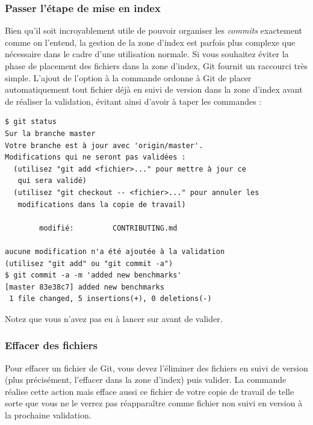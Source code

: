 \subsubsection{Passer l'étape de mise en index}

Bien qu'il soit incroyablement utile de pouvoir organiser les \emph{commits} exactement comme on l'entend, la gestion de la zone d'index est parfois plus complexe que nécessaire dans le cadre d'une utilisation normale.
Si vous souhaitez éviter la phase de placement des fichiers dans la zone d'index, Git fournit un raccourci très simple.
L'ajout de l'option  à la commande  ordonne à Git de placer automatiquement tout fichier déjà en suivi de version dans la zone d'index avant de réaliser la validation, évitant ainsi d'avoir à taper les commandes :
\begin{Schunk}
\begin{Verbatim}
$ git status
Sur la branche master
Votre branche est à jour avec 'origin/master'.
Modifications qui ne seront pas validées :
  (utilisez "git add <fichier>..." pour mettre à jour ce
   qui sera validé)
  (utilisez "git checkout -- <fichier>..." pour annuler les
   modifications dans la copie de travail)

        modifié:         CONTRIBUTING.md

aucune modification n'a été ajoutée à la validation
(utilisez "git add" ou "git commit -a")
$ git commit -a -m 'added new benchmarks'
[master 83e38c7] added new benchmarks
 1 file changed, 5 insertions(+), 0 deletions(-)
\end{Verbatim}
\end{Schunk}

Notez que vous n'avez pas eu à lancer  sur  avant de valider.

\subsubsection{Effacer des fichiers}
\label{sec:git:removing_files}

Pour effacer un fichier de Git, vous devez l'éliminer des fichiers en suivi de version (plus précisément, l'effacer dans la zone d'index) puis valider.
La commande  réalise cette action mais efface aussi ce fichier de votre copie de travail de telle sorte que vous ne le verrez pas réapparaître comme fichier non suivi en version à la prochaine validation.

